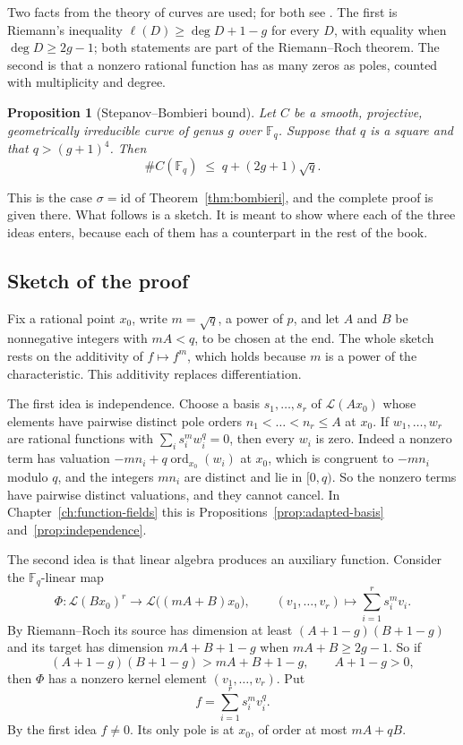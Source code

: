 \documentclass[11pt]{amsbook}
\theoremstyle{plain}
\newtheorem{proposition}[theorem]{Proposition}
\theoremstyle{definition}
\theoremstyle{remark}
\numberwithin{equation}{section}
\numberwithin{figure}{chapter}
\numberwithin{table}{chapter}
\newcommand{\F}{\mathbb{F}}
\newcommand{\Lsp}{\mathcal{L}}
\newcommand{\ord}{\operatorname{ord}}
\begin{document}
Two facts from the theory of curves are used; for both see
\cite[Exercises~16.3.E and~18.4.B, \S18.5.3]{Vakil2025}. The
first is Riemann's inequality $\ell(D) \ge \deg D + 1 - g$ for every
$D$, with equality when $\deg D \ge 2g - 1$; both statements are
part of the Riemann--Roch theorem. The second is that a nonzero
rational function has as many zeros as poles, counted with
multiplicity and degree.

\begin{proposition}[Stepanov--Bombieri bound]\label{prop:stepanov}
Let $C$ be a smooth, projective, geometrically irreducible curve of
genus $g$ over $\F_q$. Suppose that $q$ is a square and that
$q > (g+1)^4$. Then
\[
  \#C(\F_q) \;\le\; q + (2g+1)\sqrt q.
\]
\end{proposition}

This is the case $\sigma = \mathrm{id}$ of
Theorem~\ref{thm:bombieri}, and the complete proof is given there.
What follows is a sketch. It is meant to show where each of the
three ideas enters, because each of them has a counterpart in the
rest of the book.

\subsection*{Sketch of the proof}

Fix a rational point $x_0$, write $m = \sqrt q$, a power of $p$, and
let $A$ and $B$ be nonnegative integers with $mA < q$, to be chosen
at the end. The whole sketch rests on the additivity of
$f \mapsto f^m$, which holds because $m$ is a power of the
characteristic. This additivity replaces differentiation.

The first idea is independence. Choose a basis $s_1, \dots, s_r$ of
$\Lsp(Ax_0)$ whose elements have pairwise distinct pole orders
$n_1 < \dots < n_r \le A$ at $x_0$. If $w_1, \dots, w_r$ are
rational functions with $\sum_i s_i^m w_i^q = 0$, then every $w_i$
is zero. Indeed a nonzero term has valuation
$-mn_i + q\ord_{x_0}(w_i)$ at $x_0$, which is congruent to $-mn_i$
modulo $q$, and the integers $mn_i$ are distinct and lie in
$[0, q)$. So the nonzero terms have pairwise distinct valuations,
and they cannot cancel. In Chapter~\ref{ch:function-fields} this is
Propositions~\ref{prop:adapted-basis} and~\ref{prop:independence}.

The second idea is that linear algebra produces an auxiliary
function. Consider the $\F_q$-linear map
\[
  \Phi \colon \Lsp(Bx_0)^r \to \Lsp\bigl((mA + B)x_0\bigr), \qquad
  (v_1, \dots, v_r) \mapsto \sum_{i=1}^r s_i^m v_i .
\]
By Riemann--Roch its source has dimension at least
$(A + 1 - g)(B + 1 - g)$ and its target has dimension
$mA + B + 1 - g$ when $mA + B \ge 2g - 1$. So if
\begin{equation}\label{eq:kernel}
  (A + 1 - g)(B + 1 - g) > mA + B + 1 - g ,
  \qquad A + 1 - g > 0 ,
\end{equation}
then $\Phi$ has a nonzero kernel element $(v_1, \dots, v_r)$. Put
\[
  f = \sum_{i=1}^r s_i^m v_i^q .
\]
By the first idea $f \ne 0$. Its only pole is at $x_0$, of order at
most $mA + qB$.
\end{document}

